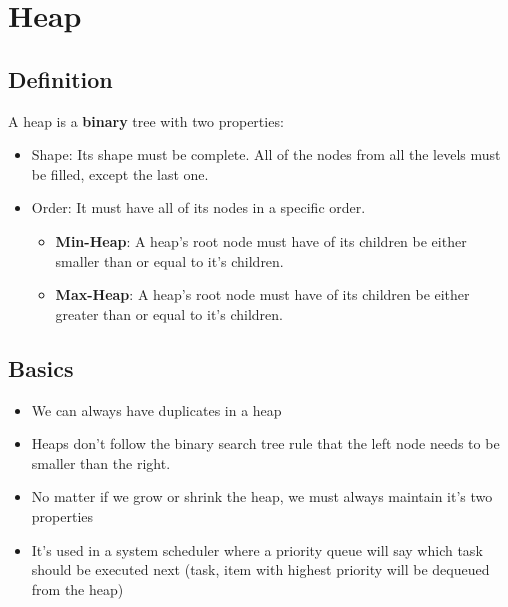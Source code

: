 \chapter{Heap}
\section{Definition}
	A heap is a \textbf{binary} tree with two properties:
	\begin{itemize}
		\item Shape: Its shape must be complete. All of the nodes from all the levels must be filled, except the last one.
		\item Order: It must have all of its nodes in a specific order.
		\begin{itemize}
			\item \textbf{Min-Heap}: A heap's root node must have of its children be either smaller than or equal to it's children.
			\item \textbf{Max-Heap}: A heap's root node must have of its children be either greater than or equal to it's children.
		\end{itemize}
	\end{itemize}
\section{Basics}
	\begin{itemize}
		\item We can always have duplicates in a heap
		\item Heaps don't follow the binary search tree rule that the left node needs to be smaller than the right.
		\item No matter if we grow or shrink the heap, we must always maintain it's two properties
		\item It's used in a system scheduler where a priority queue will say which task should be executed next (task, item with highest priority will be dequeued from the heap)
	\end{itemize}
